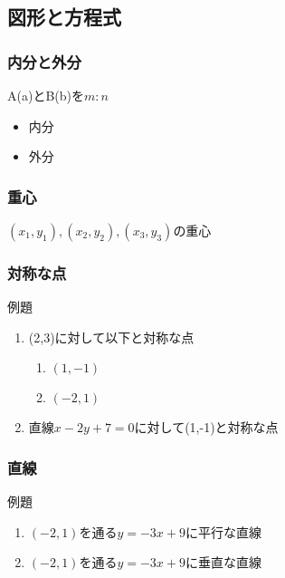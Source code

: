 \documentclass[10pt,dvipdfmx]{jsarticle}
\begin{document}
\newpage
\subsection*{図形と方程式}
\subsubsection*{内分と外分}
A(a)とB(b)を$m:n$
\begin{multicols}{2}
  \begin{itemize}
    \item 内分
    \item 外分
  \end{itemize}
\end{multicols}

\subsubsection*{重心}
$(x_1,y_1), (x_2,y_2), (x_3,y_3)$の重心
\vspace{10mm}

\subsubsection*{対称な点}
\begin{itembox}[l]{例題}
  \begin{large}
    \begin{enumerate}
      \item (2,3)に対して以下と対称な点
            \begin{multicols}{2}
              \begin{enumerate}
                \item $(1,-1)$
                \item $(-2,1)$
              \end{enumerate}
            \end{multicols}
      \item 直線$x-2y+7=0$に対して(1,-1)と対称な点
    \end{enumerate}
  \end{large}
\end{itembox}

\subsubsection*{直線}
\begin{itembox}[l]{例題}
  \begin{large}
    \begin{enumerate}
      \item $(-2,1)$を通る$y=-3x+9$に平行な直線
      \item $(-2,1)$を通る$y=-3x+9$に垂直な直線
    \end{enumerate}
  \end{large}
\end{itembox}
\end{document}
